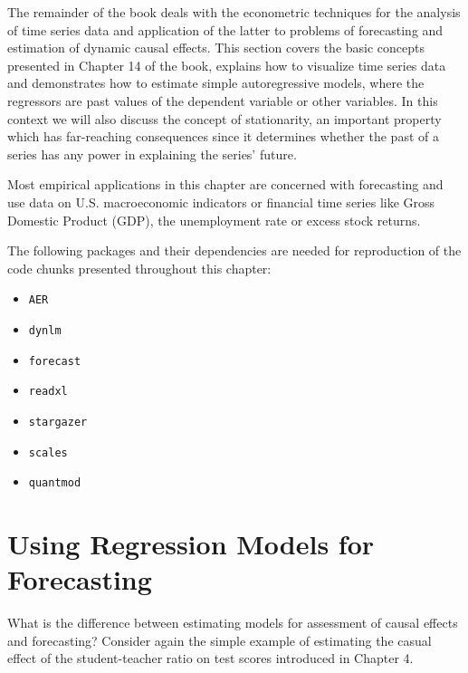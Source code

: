 \documentclass[]{book}
\newenvironment{Shaded}{\begin{snugshade}}{\end{snugshade}}
\newcommand{\KeywordTok}[1]{\textcolor[rgb]{0.13,0.29,0.53}{\textbf{#1}}}
\newcommand{\DataTypeTok}[1]{\textcolor[rgb]{0.13,0.29,0.53}{#1}}
\newcommand{\DecValTok}[1]{\textcolor[rgb]{0.00,0.00,0.81}{#1}}
\newcommand{\StringTok}[1]{\textcolor[rgb]{0.31,0.60,0.02}{#1}}
\newcommand{\OperatorTok}[1]{\textcolor[rgb]{0.81,0.36,0.00}{\textbf{#1}}}
\newcommand{\NormalTok}[1]{#1}
\providecommand{\tightlist}{%
  \setlength{\itemsep}{0pt}\setlength{\parskip}{0pt}}
\theoremstyle{definition}
\theoremstyle{definition}
\theoremstyle{definition}
\theoremstyle{remark}
\begin{document}
The remainder of the book deals with the econometric techniques for the
analysis of time series data and application of the latter to problems
of forecasting and estimation of dynamic causal effects. This section
covers the basic concepts presented in Chapter 14 of the book, explains
how to visualize time series data and demonstrates how to estimate
simple autoregressive models, where the regressors are past values of
the dependent variable or other variables. In this context we will also
discuss the concept of stationarity, an important property which has
far-reaching consequences since it determines whether the past of a
series has any power in explaining the series' future.

Most empirical applications in this chapter are concerned with
forecasting and use data on U.S. macroeconomic indicators or financial
time series like Gross Domestic Product (GDP), the unemployment rate or
excess stock returns.

The following packages and their dependencies are needed for
reproduction of the code chunks presented throughout this chapter:

\begin{itemize}
\tightlist
\item
  \texttt{AER}
\item
  \texttt{dynlm}
\item
  \texttt{forecast}
\item
  \texttt{readxl}
\item
  \texttt{stargazer}
\item
  \texttt{scales}
\item
  \texttt{quantmod}
\end{itemize}

\section{Using Regression Models for
Forecasting}\label{using-regression-models-for-forecasting}

What is the difference between estimating models for assessment of
causal effects and forecasting? Consider again the simple example of
estimating the casual effect of the student-teacher ratio on test scores
introduced in Chapter 4.

\begin{Shaded}
\end{Shaded}
\end{document}
